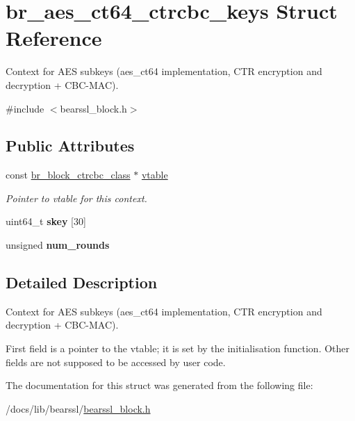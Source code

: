 \hypertarget{structbr__aes__ct64__ctrcbc__keys}{}\section{br\+\_\+aes\+\_\+ct64\+\_\+ctrcbc\+\_\+keys Struct Reference}
\label{structbr__aes__ct64__ctrcbc__keys}


Context for A\+ES subkeys ({\ttfamily aes\+\_\+ct64} implementation, C\+TR encryption and decryption + C\+B\+C-\/\+M\+AC).  




{\ttfamily \#include $<$bearssl\+\_\+block.\+h$>$}

\subsection*{Public Attributes}
\begin{DoxyCompactItemize}
\item 
\mbox{\label{structbr__aes__ct64__ctrcbc__keys_a6aecca0094570def66e724d25e702b3c}} 
const \hyperlink{bearssl__block_8h_acc35dad952fda67b68df0b107fe26f0b}{br\+\_\+block\+\_\+ctrcbc\+\_\+class} $\ast$ \hyperlink{structbr__aes__ct64__ctrcbc__keys_a6aecca0094570def66e724d25e702b3c}{vtable}
\begin{DoxyCompactList}\small\item\em Pointer to vtable for this context. \end{DoxyCompactList}\item 
\mbox{\label{structbr__aes__ct64__ctrcbc__keys_ad5fd2cc7332e75a0acd24ce8fb450b49}} 
uint64\+\_\+t {\bfseries skey} \mbox{[}30\mbox{]}
\item 
\mbox{\label{structbr__aes__ct64__ctrcbc__keys_a51be543e69586611ad5b608a53e2c908}} 
unsigned {\bfseries num\+\_\+rounds}
\end{DoxyCompactItemize}


\subsection{Detailed Description}
Context for A\+ES subkeys ({\ttfamily aes\+\_\+ct64} implementation, C\+TR encryption and decryption + C\+B\+C-\/\+M\+AC). 

First field is a pointer to the vtable; it is set by the initialisation function. Other fields are not supposed to be accessed by user code. 

The documentation for this struct was generated from the following file\+:\begin{DoxyCompactItemize}
\item 
/docs/lib/bearssl/\hyperlink{bearssl__block_8h}{bearssl\+\_\+block.\+h}\end{DoxyCompactItemize}
